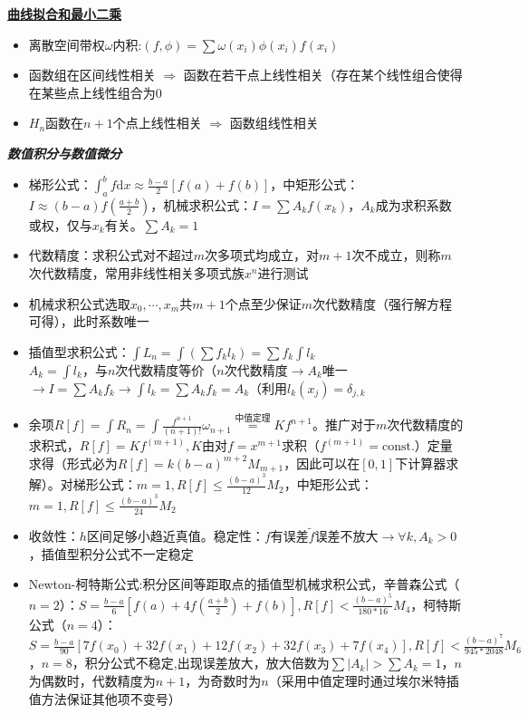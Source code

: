 \documentclass[UTF8,a4paper,landscape,compress]{paper}
\renewcommand{\subsection}[1]{{\small\textbf{\underline{#1}}}\\ }
\renewcommand{\section}[1]{{\normalsize\textbf{\emph{#1}}}\\ }
\newcommand{\List}[1]{\begin{itemize}[fullwidth,itemindent=0em] #1 \end{itemize}}
\begin{document}
\begin{multicols}{4}
    \subsection{曲线拟合和最小二乘}  
    \List{
        \item {离散空间带权$\omega$内积:$(f,\phi) = \sum \omega(x_i)\phi(x_i)f(x_i)$}
        \item {函数组在区间线性相关 $\Rightarrow$ 函数在若干点上线性相关（存在某个线性组合使得在某些点上线性组合为0}
        \item {$H_n$函数在$n+1$个点上线性相关 $\Rightarrow$ 函数组线性相关}
    }
\section{数值积分与数值微分}
    \List{
        \item {梯形公式：$\int_a^b f\mathrm dx \approx \frac{b-a}{2}[f(a)+f(b)]$，中矩形公式：$I \approx (b-a)f(\frac{a+b}{2})$，机械求积公式：$I = \sum A_kf(x_k)$，$A_k$成为求积系数或权，仅与$x_k$有关。$\sum A_k = 1$}
        \item {代数精度：求积公式对不超过$m$次多项式均成立，对$m+1$次不成立，则称$m$次代数精度，常用非线性相关多项式族$x^n$进行测试}
        \item {机械求积公式选取$x_0,\cdots,x_m$共$m+1$个点至少保证$m$次代数精度（强行解方程可得），此时系数唯一}
        \item {插值型求积公式：$\int L_n = \int (\sum f_kl_k) = \sum f_k \int l_k$\\ $A_k = \int l_k$，与$n$次代数精度等价（$n$次代数精度$\rightarrow A_k$唯一 $\rightarrow I = \sum A_kf_k \rightarrow \int l_k = \sum A_k f_k = A_k$（利用$l_k(x_j) = \delta_{j,k}$}
        \item {余项$R[f] = \int R_n = \int \frac{f^{n+1}}{(n+1)!}\omega_{n+1} \overset{\text{中值定理}}{=} Kf^{n+1}$。推广对于$m$次代数精度的求积式，$R[f] = Kf^{(m+1)},K$由对$f=x^{m+1}$求积（$f^{(m+1)}=\mathrm{const.}$）定量求得（形式必为$R[f] = k(b-a)^{m+2}M_{m+1}$，因此可以在$[0,1]$下计算器求解）。对梯形公式：$m=1,R[f] \le \frac{(b-a)^3}{12}M_2$，中矩形公式：$m=1,R[f] \le \frac{(b-a)^3}{24}M_2$}
        \item {收敛性：$h$区间足够小趋近真值。稳定性：$f$有误差$\widetilde f$误差不放大$\rightarrow \forall k,A_k >0$，插值型积分公式不一定稳定}
        \item{Newton-柯特斯公式:积分区间等距取点的插值型机械求积公式，辛普森公式（$n=2$）：$S = \frac{b-a}{6}[f(a) + 4 f(\frac{a+b}{2}) + f(b)],R[f] < \frac{(b-a)^5}{180*16}M_4$，柯特斯公式（$n=4$）：$S = \frac{b-a}{90}[7f(x_0) + 32f(x_1) + 12f(x_2) + 32 f(x_3) + 7 f(x_4)], R[f] < \frac{(b-a)^7}{945*2048}M_6$，$n=8$，积分公式不稳定,出现误差放大，放大倍数为$\sum |A_k| > \sum A_k = 1$，$n$为偶数时，代数精度为$n+1$，为奇数时为$n$（采用中值定理时通过埃尔米特插值方法保证其他项不变号）}
    }

\end{multicols}
\end{document}
